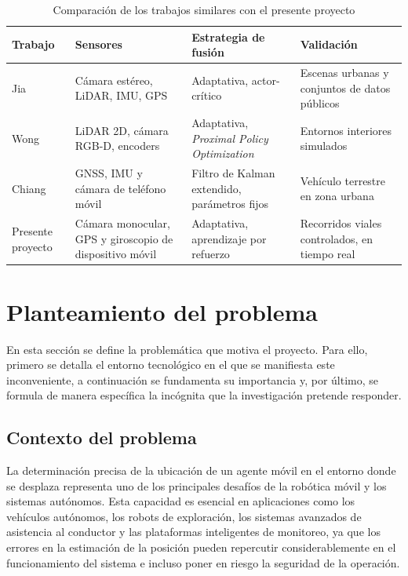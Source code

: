  
\begin{table}[H]
\centering
\caption{Comparación de los trabajos similares con el presente proyecto}
\label{tab:trabajos-similares}
\begin{tabularx}{\textwidth}{@{}lXXX@{}}
\toprule
\textbf{Trabajo} & \textbf{Sensores} & \textbf{Estrategia de fusión} & \textbf{Validación} \\
\midrule
Jia \etal{} \cite{jia2021lviofusion} & Cámara estéreo, LiDAR, IMU, GPS & Adaptativa, actor-crítico & Escenas urbanas y conjuntos de datos públicos \\
\addlinespace
Wong \etal{} \cite{wong2024drlslam} & LiDAR 2D, cámara RGB-D, encoders & Adaptativa, \textit{Proximal Policy Optimization} & Entornos interiores simulados \\
\addlinespace
Chiang \etal{} \cite{chiang2020smartphone} & GNSS, IMU y cámara de teléfono móvil & Filtro de Kalman extendido, parámetros fijos & Vehículo terrestre en zona urbana \\
\addlinespace
Presente proyecto & Cámara monocular, GPS y giroscopio de dispositivo móvil & Adaptativa, aprendizaje por refuerzo & Recorridos viales controlados, en tiempo real \\
\bottomrule
\end{tabularx}
\end{table}


\section{Planteamiento del problema}

En esta sección se define la problemática que motiva el proyecto.
Para ello, primero se detalla el entorno tecnológico en el que se manifiesta este inconveniente, a continuación se fundamenta su importancia y, por último, se formula de manera específica la incógnita que la investigación pretende responder.

\subsection{Contexto del problema}

La determinación precisa de la ubicación de un agente móvil en el entorno donde se desplaza representa uno de los principales desafíos de la robótica móvil y los sistemas autónomos.
Esta capacidad es esencial en aplicaciones como los vehículos autónomos, los robots de exploración, los sistemas avanzados de asistencia al conductor y las plataformas inteligentes de monitoreo, ya que los errores en la estimación de la posición pueden repercutir considerablemente en el funcionamiento del sistema e incluso poner en riesgo la seguridad de la operación.

